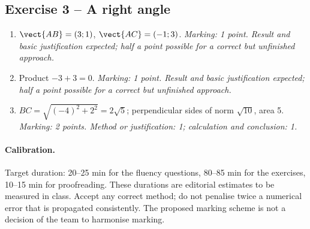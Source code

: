 \subsection*{Exercise 3 -- A right angle}
\begin{enumerate}
\item $\vect{AB}=(3;1)$, $\vect{AC}=(-1;3)$. \textit{Marking: 1 point. Result and basic justification expected; half a point possible for a correct but unfinished approach.}
\item Product $-3+3=0$. \textit{Marking: 1 point. Result and basic justification expected; half a point possible for a correct but unfinished approach.}
\item $BC=\sqrt{(-4)^2+2^2}=2\sqrt5$; perpendicular sides of norm $\sqrt{10}$, area 5. \textit{Marking: 2 points. Method or justification: 1; calculation and conclusion: 1.}
\end{enumerate}
\paragraph{Calibration.} Target duration: 20--25 min for the fluency questions, 80--85 min for the exercises, 10--15 min for proofreading. These durations are editorial estimates to be measured in class. Accept any correct method; do not penalise twice a numerical error that is propagated consistently. The proposed marking scheme is not a decision of the team to harmonise marking.
